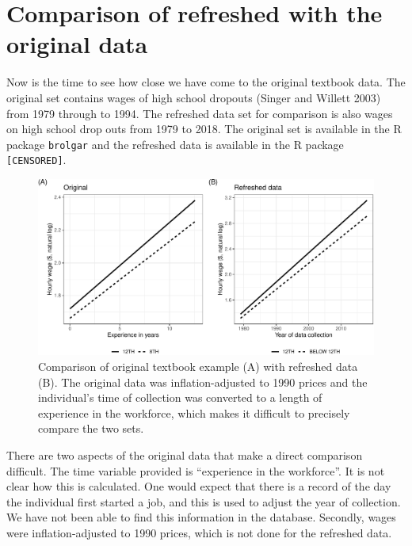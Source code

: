 \documentclass{article}
\begin{document}
\hypertarget{compare}{%
\section{Comparison of refreshed with the original data}\label{compare}}

Now is the time to see how close we have come to the original textbook data. The original set contains wages of high school dropouts (Singer and Willett 2003) from 1979 through to 1994. The refreshed data set for comparison is also wages on high school drop outs from 1979 to 2018. The original set is available in the R package \texttt{brolgar} and the refreshed data is available in the R package \texttt{[CENSORED]}.

\begin{figure}

{\centering \includegraphics[width=1\linewidth]{figures/plotting-sw-do-1} 

}

\caption{Comparison of original textbook example (A) with refreshed data (B). The original data was inflation-adjusted to 1990 prices and the individual's time of collection was converted to a length of experience in the workforce, which makes it difficult to precisely compare the two sets.}\label{fig:plotting-sw-do}
\end{figure}

There are two aspects of the original data that make a direct comparison difficult. The time variable provided is ``experience in the workforce''. It is not clear how this is calculated. One would expect that there is a record of the day the individual first started a job, and this is used to adjust the year of collection. We have not been able to find this information in the database. Secondly, wages were inflation-adjusted to 1990 prices, which is not done for the refreshed data.
\end{document}
